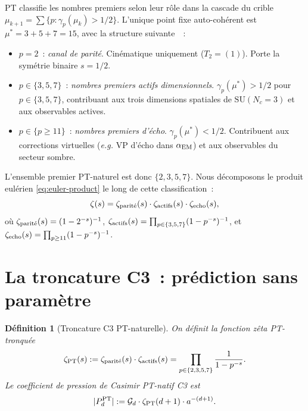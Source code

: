 \documentclass[11pt,a4paper]{article}
\newtheorem{definition}{Définition}
\newcommand{\actives}{\{3,5,7\}}
\newcommand{\PTset}{\{2,3,5,7\}}
\newcommand{\echoes}{\{p \geq 11\}}
\begin{document}
PT classifie les nombres premiers selon leur rôle dans la cascade du crible
$\mu_{k+1} = \sum \{p : \gamma_{p}(\mu_{k}) > 1/2 \}$. L'unique point fixe auto-cohérent est
$\mu^{*} = 3 + 5 + 7 = 15$, avec la structure suivante~\cite{Senez2026}~:

\begin{itemize}
  \item $p = 2$~: \emph{canal de parité}. Cinématique uniquement ($T_{2} = (1)$). Porte la symétrie
  binaire $s = 1/2$.
  \item $p \in \actives$~: \emph{nombres premiers actifs dimensionnels}. $\gamma_{p}(\mu^{*}) > 1/2$
  pour $p \in \actives$, contribuant aux trois dimensions spatiales de $\mathrm{SU}(N_{c}=3)$ et
  aux observables actives.
  \item $p \in \echoes$~: \emph{nombres premiers d'écho}. $\gamma_{p}(\mu^{*}) < 1/2$.
  Contribuent aux corrections virtuelles (\emph{e.g.} VP d'écho dans $\alpha_{\rm EM}$) et aux
  observables du secteur sombre.
\end{itemize}

L'ensemble premier PT-naturel est donc $\PTset$. Nous décomposons le produit eulérien
\eqref{eq:euler-product} le long de cette classification~:
\begin{equation}
\zeta(s) = \zeta_{\rm parit\acute{e}}(s) \cdot \zeta_{\rm actifs}(s) \cdot \zeta_{\rm echo}(s),
\label{eq:pt-split}
\end{equation}
où $\zeta_{\rm parit\acute{e}}(s) = (1 - 2^{-s})^{-1}$,
$\zeta_{\rm actifs}(s) = \prod_{p \in \actives}(1-p^{-s})^{-1}$, et
$\zeta_{\rm echo}(s) = \prod_{p \geq 11}(1-p^{-s})^{-1}$.

\section{La troncature C3~: prédiction sans paramètre}
\label{sec:c3}

\begin{definition}[Troncature C3 PT-naturelle]
On définit la fonction zêta PT-tronquée
\begin{equation}
\zeta_{\rm PT}(s) := \zeta_{\rm parit\acute{e}}(s) \cdot \zeta_{\rm actifs}(s)
                   = \prod_{p \in \PTset}\frac{1}{1 - p^{-s}}.
\end{equation}
Le coefficient de pression de Casimir PT-natif C3 est
\begin{equation}
|P_{d}^{\rm PT}| := \mathcal{G}_{d} \cdot \zeta_{\rm PT}(d+1) \cdot a^{-(d+1)}.
\end{equation}
\end{definition}
\end{document}
